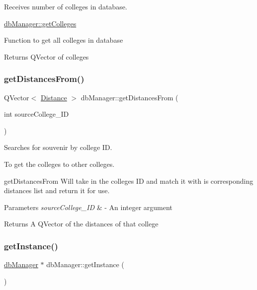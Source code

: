 Receives number of colleges in database. 

\mbox{\hyperlink{classdb_manager_aad9d2f24ac9c74728393502b6c04a0b8}{db\+Manager\+::get\+Colleges}}

Function to get all colleges in database \begin{DoxyReturn}{Returns}
Q\+Vector of colleges 
\end{DoxyReturn}
\mbox{\label{classdb_manager_aaa56ad9c1a84cd0063efa1551b297138}} 
\subsubsection{\texorpdfstring{get\+Distances\+From()}{getDistancesFrom()}}
{\footnotesize\ttfamily Q\+Vector$<$ \mbox{\hyperlink{struct_distance}{Distance}} $>$ db\+Manager\+::get\+Distances\+From (\begin{DoxyParamCaption}\item[{int}]{source\+College\+\_\+\+ID }\end{DoxyParamCaption})}



Searches for souvenir by college ID. 

To get the colleges to other colleges.

get\+Distances\+From Will take in the colleges ID and match it with is corresponding distances list and return it for use. 
\begin{DoxyParams}{Parameters}
{\em source\+College\+\_\+\+ID} & -\/ An integer argument \\
\hline
\end{DoxyParams}
\begin{DoxyReturn}{Returns}
A Q\+Vector of the distances of that college 
\end{DoxyReturn}
\mbox{\label{classdb_manager_a0b96aeab4f66563db74711be1dfc1edb}} 
\subsubsection{\texorpdfstring{get\+Instance()}{getInstance()}}
{\footnotesize\ttfamily \mbox{\hyperlink{classdb_manager}{db\+Manager}} $\ast$ db\+Manager\+::get\+Instance (\begin{DoxyParamCaption}{ }\end{DoxyParamCaption})\hspace{0.3cm}{\ttfamily [static]}}




